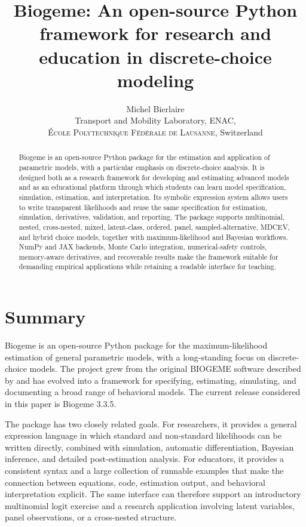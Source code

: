 \documentclass[11pt]{article}
\title{Biogeme: An open-source Python framework for research and education in discrete-choice modeling}
\author{Michel Bierlaire\\
  Transport and Mobility Laboratory, ENAC,\\
  \textsc{École Polytechnique Fédérale de Lausanne}, Switzerland}
\date{}
\begin{document}
\maketitle

\begin{abstract}
Biogeme is an open-source Python package for the estimation and application of
parametric models, with a particular emphasis on discrete-choice analysis. It
is designed both as a research framework for developing and estimating advanced
models and as an educational platform through which students can learn model
specification, simulation, estimation, and interpretation. Its symbolic
expression system allows users to write transparent likelihoods and reuse the
same specification for estimation, simulation, derivatives, validation, and
reporting. The package supports multinomial, nested, cross-nested, mixed,
latent-class, ordered, panel, sampled-alternative, MDCEV, and hybrid choice
models, together with maximum-likelihood and Bayesian workflows. NumPy and JAX
backends, Monte Carlo integration, numerical-safety controls, memory-aware
derivatives, and recoverable results make the framework suitable for demanding
empirical applications while retaining a readable interface for teaching.
\end{abstract}

\section{Summary}

Biogeme is an open-source Python package for the maximum-likelihood estimation
of general parametric models, with a long-standing focus on discrete-choice
models. The project grew from the original BIOGEME software described by
\citet{Bierlaire2003,BierlaireFetiarison2009} and has evolved into a framework
for specifying, estimating, simulating, and documenting a broad range of
behavioral models. The current release considered in this paper is Biogeme
3.3.5.

The package has two closely related goals. For researchers, it provides a
general expression language in which standard and non-standard likelihoods can
be written directly, combined with simulation, automatic differentiation,
Bayesian inference, and detailed post-estimation analysis. For educators, it
provides a consistent syntax and a large collection of runnable examples that
make the connection between equations, code, estimation output, and behavioral
interpretation explicit. The same interface can therefore support an
introductory multinomial logit exercise and a research application involving
latent variables, panel observations, or a cross-nested structure.
\end{document}
